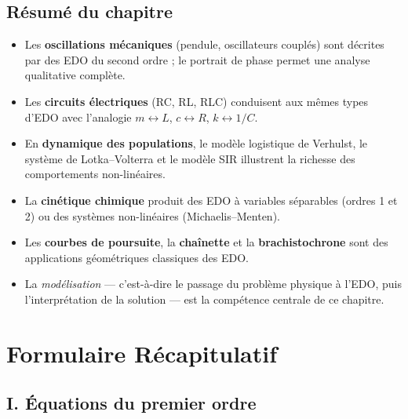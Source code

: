 \documentclass[12pt,a4paper,openany]{book}
\theoremstyle{definition}
\theoremstyle{plain}
\theoremstyle{remark}
\begin{document}
\section*{Résumé du chapitre}

\begin{itemize}
  \item Les \textbf{oscillations mécaniques} (pendule, oscillateurs
        couplés) sont décrites par des EDO du second ordre ; le
        portrait de phase permet une analyse qualitative complète.
  \item Les \textbf{circuits électriques} (RC, RL, RLC) conduisent
        aux mêmes types d'EDO avec l'analogie
        $m \leftrightarrow L$, $c \leftrightarrow R$,
        $k \leftrightarrow 1/C$.
  \item En \textbf{dynamique des populations}, le modèle logistique
        de Verhulst, le système de Lotka--Volterra et le modèle SIR
        illustrent la richesse des comportements non-linéaires.
  \item La \textbf{cinétique chimique} produit des EDO à variables
        séparables (ordres 1 et 2) ou des systèmes non-linéaires
        (Michaelis--Menten).
  \item Les \textbf{courbes de poursuite}, la \textbf{chaînette} et
        la \textbf{brachistochrone} sont des applications géométriques
        classiques des EDO.
  \item La \emph{modélisation} --- c'est-à-dire le passage du
        problème physique à l'EDO, puis l'interprétation de la
        solution --- est la compétence centrale de ce chapitre.
\end{itemize}


\chapter*{Formulaire Récapitulatif}
\label{chap:formulaire}

\section*{I. Équations du premier ordre}
\end{document}
